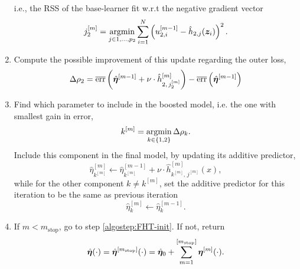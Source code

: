 \begin{algorithm}
\begin{enumerate}
        i.e., the RSS of the base-learner fit w.r.t the negative gradient vector
        \begin{equation*}
            j_2^{[m]}=\operatorname*{argmin}_{j\in 1,\ldots,p_2}\sum_{i=1}^N\left(u_{2,i}^{[m-1]}-\hat{h}_{2,j}(\bm{z}_i)\right)^2.
        \end{equation*}
    \item
        Compute the possible improvement of this update regarding the outer loss,
        \begin{equation*}
            \Delta\rho_2=\overline{\text{err}}\left(\hat{\boldsymbol{\eta}}^{[m-1]} + \nu \cdot \hat{h}^{[m]}_{2,\,j_2^{[m]}} \right)-\overline{\text{err}}\left(\hat{\boldsymbol{\eta}}^{[m-1]}  \right)
        \end{equation*}
    \item
    \label{algostep:FHT-end}
        Find which parameter to include in the boosted model, i.e. the one with smallest gain in error,
        \begin{equation*}
            k^{[m]}=\operatorname*{argmin}_{k\in\{1,2\}}\Delta\rho_k.
        \end{equation*}
        Include this component in the final model, by updating its additive predictor,
        \begin{equation*}
            \hat{\eta}^{[m]}_{k^{[m]}}\gets\hat{\eta}^{[m-1]}_{k^{[m]}}+\nu\cdot\hat{h}^{[m]}_{k^{[m]},\,j^{[m]}}(x),
        \end{equation*}
        while for the other component $k\neq k^{[m]}$, set the additive predictor for this iteration to be the same as previous iteration
        \begin{equation*}
            \hat{\eta}^{[m]}_{k}\gets\hat{\eta}^{[m-1]}_{k}.
        \end{equation*}
    \item
        If $m<m_{\text{stop}}$, go to step \ref{algostep:FHT-init}.
        If not, return
        \begin{equation*}
            \hat{\boldsymbol{\eta}}(\cdot)=\hat{\boldsymbol{\eta}}^{[m_{\text{stop}}]}(\cdot)=\hat{\boldsymbol{\eta}}_0+\sum_{m=1}^{[m_{\text{stop}}]}\boldsymbol{\eta}^{[m]}(\cdot).
        \end{equation*}
\end{enumerate}
\end{algorithm}

